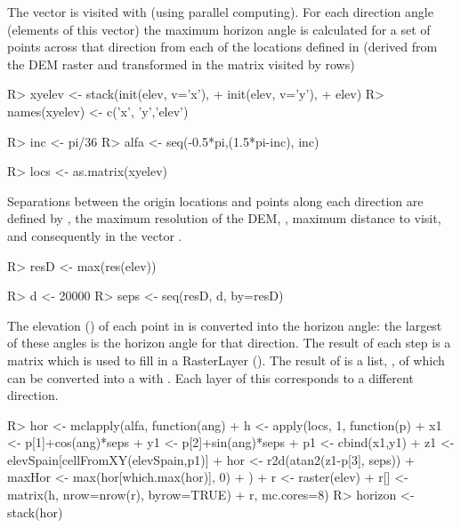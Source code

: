 \documentclass[article]{jss}
\begin{document}
The  vector is visited with  (using parallel
computing). For each direction angle (elements of this vector) the
maximum horizon angle is calculated for a set of points across that
direction from each of the locations defined in  (derived
from the DEM raster and transformed in the matrix  visited
by rows)

\begin{CodeChunk}
\begin{CodeInput}
R> xyelev <- stack(init(elev, v='x'),
+                 init(elev, v='y'),
+                 elev)
R> names(xyelev) <- c('x', 'y','elev')


R> inc <- pi/36
R> alfa <- seq(-0.5*pi,(1.5*pi-inc), inc)

R> locs <- as.matrix(xyelev)
\end{CodeInput}
\end{CodeChunk}

Separations between the origin locations and points along each
direction are defined by , the maximum resolution of the
DEM, , maximum distance to visit, and consequently in the
vector .

\begin{CodeChunk}
\begin{CodeInput}
R> resD <- max(res(elev))

R> d <- 20000
R> seps <- seq(resD, d, by=resD)
\end{CodeInput}
\end{CodeChunk}

The elevation () of each point in  is converted
into the horizon angle: the largest of these angles is the horizon
angle for that direction. The result of each  step is a
matrix which is used to fill in a RasterLayer (). The result
of  is a list, , of  which
can be converted into a  with . Each
layer of this  corresponds to a different direction.

\begin{CodeChunk}
\begin{CodeInput}
R> hor <- mclapply(alfa, function(ang){
+     h <- apply(locs, 1, function(p){
+         x1 <- p[1]+cos(ang)*seps
+         y1 <- p[2]+sin(ang)*seps
+         p1 <- cbind(x1,y1)
+         z1 <- elevSpain[cellFromXY(elevSpain,p1)]
+         hor <- r2d(atan2(z1-p[3], seps))
+         maxHor <- max(hor[which.max(hor)], 0)
+     })
+     r <- raster(elev)
+     r[] <- matrix(h, nrow=nrow(r), byrow=TRUE)
+     r}, mc.cores=8)
R> horizon <- stack(hor)
\end{CodeInput}
\end{CodeChunk}
\end{document}
